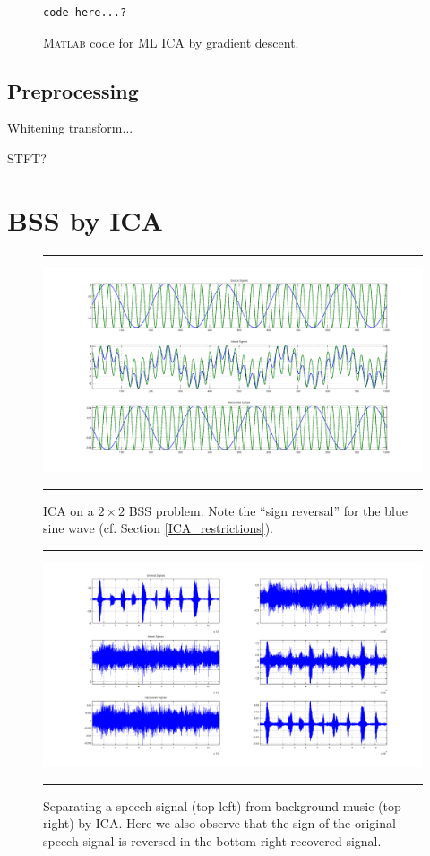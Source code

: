 \documentclass[11pt, oneside, a4paper]{report}
\begin{document}
\begin{figure}[!htpb]
  \begin{lstlisting}[frame=single]
    code here...?
  \end{lstlisting}
  \caption{\textsc{Matlab} code for ML ICA by gradient descent.}
  \label{mlica_code}
\end{figure}



\subsection{Preprocessing}\label{ica_preprocessing}

Whitening transform...

STFT?

\section{BSS by ICA}\label{BSS_ICA}


\begin{figure}
  \centering
  \hrule
  \includegraphics[width = .9\textwidth]{Figures/ica_simple}
  \hrule
  \caption{ICA on a $2\times 2$ BSS problem. Note the ``sign reversal'' for the blue sine wave (cf. Section \ref{ICA_restrictions}).}
\end{figure}

\begin{figure}
  \centering
  \hrule
  \includegraphics[width = .9\textwidth]{Figures/ica_music_speech}
  \hrule
  \caption{Separating a speech signal (top left) from background music (top right) by ICA. Here we also observe that the sign of the original speech signal is reversed in the bottom right recovered signal. }
\end{figure}
\end{document}
